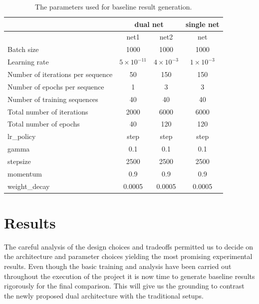 \documentclass[a4paper, 12pt]{article}
\numberwithin{equation}{section}
\begin{document}
	\begin{table}[ht!]
		\centering
		\caption{The parameters used for baseline result generation.}
		\label{tab:parameters}
		\begin{tabular}{|l|c|c|c|}
			\hline
			& \multicolumn{2}{c|}{dual net} & single net \\ \hline
			& net1          & net2          & net        \\ \hline
			Batch size                        & 1000          & 1000          & 1000       \\ \hline
			Learning rate                     & $5\times10^{-11}$             & $4\times10^{-3}$             & $1\times10^{-3}$         \\ \hline
			Number of iterations per sequence & 50            & 150           & 150        \\ \hline
			Number of epochs per sequence     & 1             & 3             & 3          \\ \hline
			Number of training sequences      & 40            & 40            & 40         \\ \hline
			Total number of iterations        & 2000          & 6000          & 6000       \\ \hline
			Total number of epochs            & 40            & 120           & 120        \\ \hline
			lr\_policy                        & step          & step          & step       \\ \hline
			gamma                             & 0.1           & 0.1           & 0.1        \\ \hline
			stepsize                          & 2500          & 2500          & 2500       \\ \hline
			momentum                          & 0.9           & 0.9           & 0.9        \\ \hline
			weight\_decay                     & 0.0005        & 0.0005        & 0.0005     \\ \hline
		\end{tabular}
	\end{table}

	\section{Results}

	The careful analysis of the design choices and tradeoffs permitted us to decide on the architecture and parameter choices yielding the most promising experimental results. Even though the basic training and analysis have been carried out throughout the execution of the project it is now time to generate baseline results rigorously for the final comparison. This will give us the grounding to contrast the newly proposed dual architecture with the traditional setups.
\end{document}
